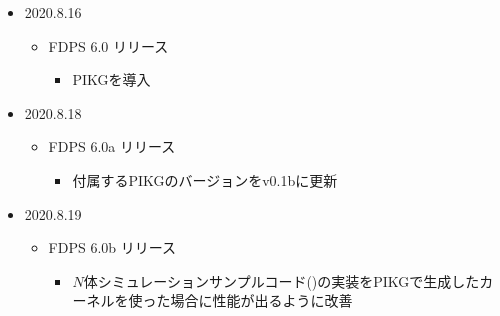 \begin{itemize}
  \item 2020.8.16
    \begin{itemize}
    \item FDPS 6.0 リリース
       \begin{itemize}
          \item PIKGを導入
       \end{itemize}
    \end{itemize}
    
  \item 2020.8.18
    \begin{itemize}
    \item FDPS 6.0a リリース
       \begin{itemize}
          \item 付属するPIKGのバージョンをv0.1bに更新
       \end{itemize}
    \end{itemize}

  \item 2020.8.19
    \begin{itemize}
    \item FDPS 6.0b リリース
       \begin{itemize}
          \item $N$体シミュレーションサンプルコード()の実装をPIKGで生成したカーネルを使った場合に性能が出るように改善
       \end{itemize}
    \end{itemize}

\end{itemize}
